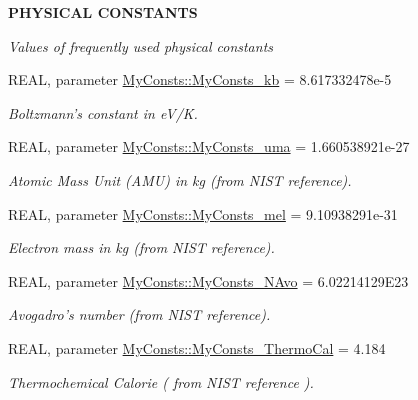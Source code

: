 \begin{Indent}{\bf PHYSICAL CONSTANTS}\par
{\em \label{_amgrpb70515a7c0eef9512cf1cb068a7ba792}
Values of frequently used physical constants }\begin{DoxyCompactItemize}
\item 
REAL, parameter \hyperlink{namespace_my_consts_a8ec037cf234b67a520136aaea3133b7c}{MyConsts::MyConsts\_\-kb} = 8.617332478e-\/5
\begin{DoxyCompactList}\small\item\em Boltzmann's constant in eV/K. \item\end{DoxyCompactList}\item 
REAL, parameter \hyperlink{namespace_my_consts_a3b04681501dc44eeb3701aa7ee2f220e}{MyConsts::MyConsts\_\-uma} = 1.660538921e-\/27
\begin{DoxyCompactList}\small\item\em Atomic Mass Unit (AMU) in kg (from NIST reference). \item\end{DoxyCompactList}\item 
REAL, parameter \hyperlink{namespace_my_consts_aa1367128efaba1f65ead2ceb9f64db46}{MyConsts::MyConsts\_\-mel} = 9.10938291e-\/31
\begin{DoxyCompactList}\small\item\em Electron mass in kg (from NIST reference). \item\end{DoxyCompactList}\item 
REAL, parameter \hyperlink{namespace_my_consts_a9d0cf18aaa762022e93aa97d649e6cbd}{MyConsts::MyConsts\_\-NAvo} = 6.02214129E23
\begin{DoxyCompactList}\small\item\em Avogadro's number (from NIST reference). \item\end{DoxyCompactList}\item 
REAL, parameter \hyperlink{namespace_my_consts_ac5ba183f9282fe2c8554f8b9f5c7d5d1}{MyConsts::MyConsts\_\-ThermoCal} = 4.184
\begin{DoxyCompactList}\small\item\em Thermochemical Calorie ( from NIST reference ). \item\end{DoxyCompactList}\end{DoxyCompactItemize}
\end{Indent}
